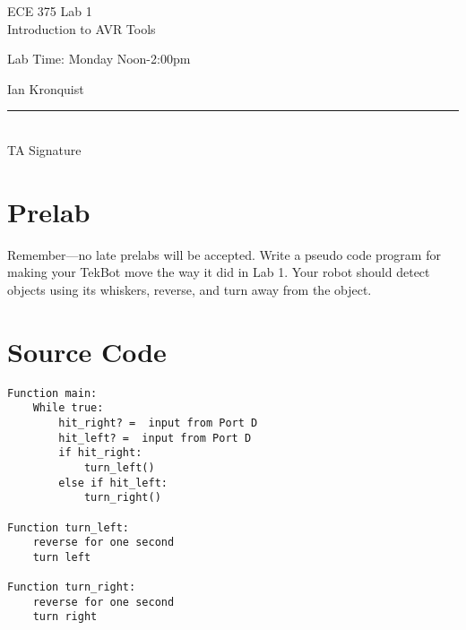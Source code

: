 \documentclass[12pt,letterpaper]{article}
\begin{document}
\begin{titlepage}
    \vspace*{4cm}
    \begin{flushright}
    {\huge
        ECE 375 Lab 1\\[1cm]
    }
    {\large
        Introduction to AVR Tools
    }
    \end{flushright}
    \begin{flushleft}
    Lab Time: Monday Noon-2:00pm
    \end{flushleft}
    \begin{flushright}
    Ian Kronquist
    \vfill
    \rule{5in}{.5mm}\\
    TA Signature
    \end{flushright}

\end{titlepage}

\section{Prelab}
Remember—no late prelabs will be accepted.
Write a pseudo code program for making your TekBot move the way it did in Lab
1. Your robot should detect objects using its whiskers, reverse, and turn away
from the object.

\section{Source Code}
\begin{verbatim}
Function main:
    While true:
        hit_right? =  input from Port D
        hit_left? =  input from Port D
        if hit_right:
            turn_left()
        else if hit_left:
            turn_right()

Function turn_left:
    reverse for one second
    turn left

Function turn_right:
    reverse for one second
    turn right
\end{verbatim}
\end{document}
